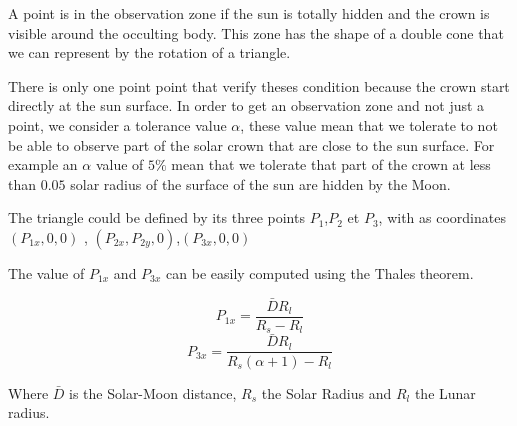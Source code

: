 \documentclass[11pt]{article} %
\begin{document}
		
		A point is in the observation zone if the sun is totally hidden and the crown is visible around the occulting body. This zone has the shape of a double cone that we can represent by the rotation of a triangle.
		
		There is only one point point that verify theses condition because the crown start directly at the sun surface. In order to get an observation zone and not just a point, we consider a tolerance value $\alpha$, these value mean that we tolerate to not be able to observe part of the solar crown that are close to the sun surface. For example an $\alpha$ value of $5\%$ mean that we tolerate that part of the crown at less than $0.05$ solar radius of the surface of the sun are hidden by the Moon.
		
		
		The triangle could be defined by its three points
		$P_1$,$P_2$ et $P_3$, with as coordinates $(P_{1x},0,0)$ , $(P_{2x},P_{2y},0)$,$(P_{3x},0,0)$ 
		
		
		The value of $P_{1x}$ and $P_{3x}$ can be easily computed using the Thales theorem.
		
		
		$$	
		P_{1x}=\frac{\bar{D}R_l}{R_s-R_l}
		$$ 
		$$	
		P_{3x}=\frac{\bar{D}R_l}{R_s(\alpha+1)-R_l}
		$$
		
		Where $\bar{D}$ is the Solar-Moon distance, $R_s$ the Solar Radius and $R_l$ the Lunar radius.
		
\end{document}
